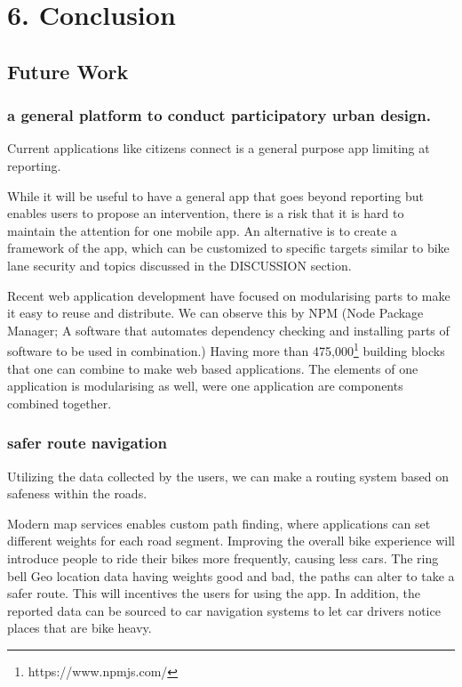 \chapter{6. Conclusion}

\section{Future Work}
\subsection{a general platform to conduct participatory urban design.}
Current applications like citizens connect is a general purpose app limiting at reporting. 

While it will be useful to have a general app that goes beyond reporting but enables users to propose an intervention, there is a risk that it is hard to maintain the attention for one mobile app. An alternative is to create a framework of the app, which can be customized to specific targets similar to bike lane security and topics discussed in the DISCUSSION section.

Recent web application development have focused on modularising parts to make it easy to reuse and distribute. We can observe this by NPM (Node Package Manager; A software that automates dependency checking and installing parts of software to be used in combination.) Having more than 475,000\footnote{https://www.npmjs.com/} building blocks that one can combine to make web based applications. The elements of one application is modularising as well, were one application are components combined together.

\subsection{safer route navigation}
Utilizing the data collected by the users, we can make a routing system based on safeness within the roads.

Modern map services enables custom path finding, where applications can set different weights for each road segment. Improving the overall bike experience will introduce people to ride their bikes more frequently, causing less cars.
The ring bell Geo location data having weights good and bad, the paths can alter to take a safer route. This will incentives the users for using the app.
In addition, the reported data can be sourced to car navigation systems to let car drivers notice places that are bike heavy.

